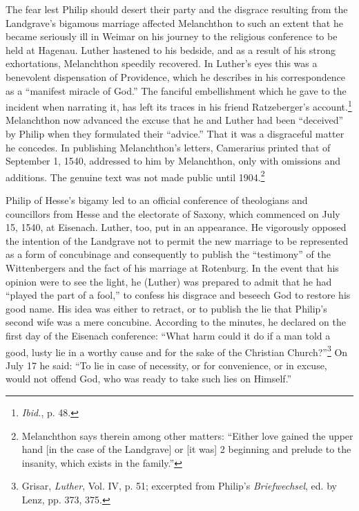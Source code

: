The fear lest Philip should desert their party and the disgrace resulting
from the Landgrave’s bigamous marriage affected Melanchthon to such an
extent that he became seriously ill in Weimar on
his journey to the religious conference to be held at Hagenau. Luther
hastened to his bedside, and as a result of his strong exhortations,
Melanchthon speedily recovered. In Luther’s eyes this was a benevolent
dispensation of Providence, which he describes in his correspondence
as a “manifest miracle of God.” The fanciful embellishment which
he gave to the incident when narrating it, has left its traces in his
friend Ratzeberger’s account.\footnote{\textit{Ibid.}, p. 48.}
Melanchthon now advanced the excuse
that he and Luther had been “deceived” by Philip when they
formulated their “advice.” That it was a disgraceful matter he concedes.
In publishing Melanchthon’s letters, Camerarius printed that
of September 1, 1540, addressed to him by Melanchthon, only with
omissions and additions. The genuine text was not made public
until 1904.\footnote
{Melanchthon says therein among other matters: “Either love gained the upper hand
[in the case of the Landgrave] or [it was] 2 beginning and prelude to the insanity, which
exists in the family.”}

Philip of Hesse’s bigamy led to an official conference of theologians
and councillors from Hesse and the electorate of Saxony,
which commenced on July 15, 1540, at Eisenach. Luther, too, put in
an appearance. He vigorously opposed the intention of the Landgrave
not to permit the new marriage to be represented as a form of concubinage
and consequently to publish the “testimony” of the Wittenbergers and the
fact of his marriage at Rotenburg. In the event that his
opinion were to see the light, he (Luther) was prepared to admit that
he had “played the part of a fool,” to confess his disgrace and beseech
God to restore his good name. His idea was either to retract, or
to publish the lie that Philip’s second wife was a mere concubine. According
to the minutes, he declared on the first day of the Eisenach
conference: “What harm could it do if a man told a good, lusty lie
in a worthy cause and for the sake of the Christian Church?”\footnote
{Grisar, \textit{Luther}, Vol. IV, p. 51; excerpted from Philip’s \textit{Briefwechsel}, ed. by Lenz, pp.
373, 375.}
On July 17 he said: “To lie in case of necessity, or for convenience, or in
excuse, would not offend God, who was ready to take such lies on
Himself.”

